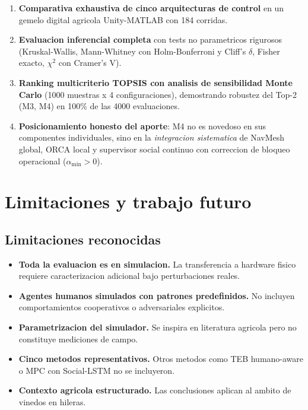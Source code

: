 \documentclass[12pt,a4paper,oneside]{book}
\begin{document}
\begin{enumerate}[leftmargin=*]
    \item \textbf{Comparativa exhaustiva de cinco arquitecturas de control} en un gemelo digital agricola Unity-MATLAB con 184 corridas.
    \item \textbf{Evaluacion inferencial completa} con tests no parametricos rigurosos (Kruskal-Wallis, Mann-Whitney con Holm-Bonferroni y Cliff's $\delta$, Fisher exacto, $\chi^2$ con Cramer's V).
    \item \textbf{Ranking multicriterio TOPSIS con analisis de sensibilidad Monte Carlo} (1000 muestras x 4 configuraciones), demostrando robustez del Top-2 (M3, M4) en 100\% de las 4000 evaluaciones.
    \item \textbf{Posicionamiento honesto del aporte}: M4 no es novedoso en sus componentes individuales, sino en la \emph{integracion sistematica} de NavMesh global, ORCA local y supervisor social continuo con correccion de bloqueo operacional ($\alpha_{\min} > 0$).
\end{enumerate}

\chapter{Limitaciones y trabajo futuro}
\label{chap:limitaciones}

\section{Limitaciones reconocidas}

\begin{itemize}[leftmargin=*]
    \item \textbf{Toda la evaluacion es en simulacion.} La transferencia a hardware fisico requiere caracterizacion adicional bajo perturbaciones reales.
    \item \textbf{Agentes humanos simulados con patrones predefinidos.} No incluyen comportamientos cooperativos o adversariales explicitos.
    \item \textbf{Parametrizacion del simulador.} Se inspira en literatura agricola pero no constituye mediciones de campo.
    \item \textbf{Cinco metodos representativos.} Otros metodos como TEB humano-aware o MPC con Social-LSTM no se incluyeron.
    \item \textbf{Contexto agricola estructurado.} Las conclusiones aplican al ambito de vinedos en hileras.
\end{itemize}
\end{document}
